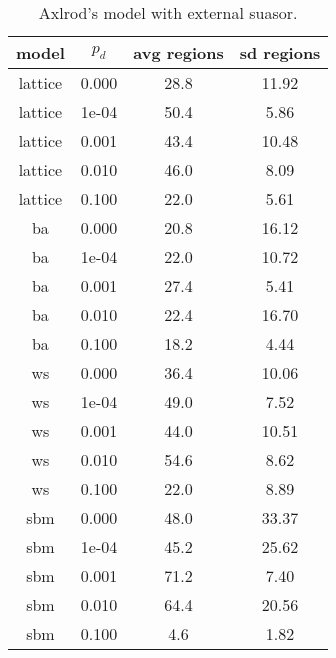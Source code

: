 
\begin{table}[htbp]
\centering
\caption{Axlrod's model with external suasor.} 
\begin{tabular}{cccc}
  
model & $p_d$ & avg regions & sd regions \\ 
\midrule
lattice & 0.000 & 28.8 & 11.92\\
lattice & 1e-04 & 50.4 & 5.86\\
lattice & 0.001 & 43.4 & 10.48\\
lattice & 0.010 & 46.0 & 8.09\\
lattice & 0.100 & 22.0 & 5.61\\
ba & 0.000 & 20.8 & 16.12\\
ba & 1e-04 & 22.0 & 10.72\\
ba & 0.001 & 27.4 & 5.41\\
ba & 0.010 & 22.4 & 16.70\\
ba & 0.100 & 18.2 & 4.44\\
ws & 0.000 & 36.4 & 10.06\\
ws & 1e-04 & 49.0 & 7.52\\
ws & 0.001 & 44.0 & 10.51\\
ws & 0.010 & 54.6 & 8.62\\
ws & 0.100 & 22.0 & 8.89\\
sbm & 0.000 & 48.0 & 33.37\\
sbm & 1e-04 & 45.2 & 25.62\\
sbm & 0.001 & 71.2 & 7.40\\
sbm & 0.010 & 64.4 & 20.56\\
sbm & 0.100 & 4.6 & 1.82\\
\bottomrule
\end{tabular}

\label{tab:suasor}
\end{table}
